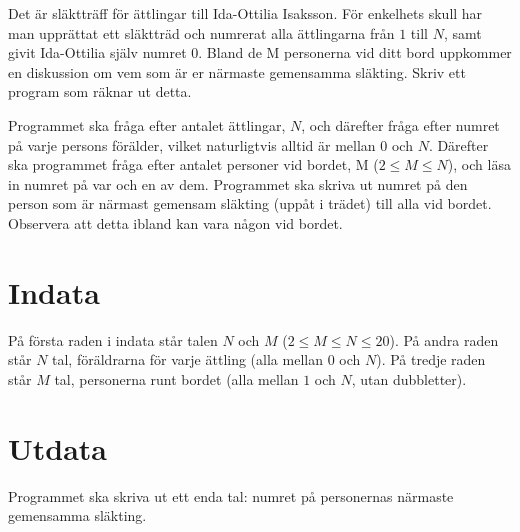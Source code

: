 Det är släktträff för ättlingar till Ida-Ottilia Isaksson.
För enkelhets skull har man upprättat ett släktträd och numrerat alla ättlingarna från $1$ till $N$, samt givit Ida-Ottilia själv numret $0$.
Bland de M personerna vid ditt bord uppkommer en diskussion om vem som är er närmaste gemensamma släkting.
Skriv ett program som räknar ut detta.

Programmet ska fråga efter antalet ättlingar, $N$, och därefter fråga efter numret på varje persons förälder, vilket naturligtvis alltid är mellan $0$ och $N$.
Därefter ska programmet fråga efter antalet personer vid bordet, M ($2 \le M \le N$), och läsa in numret på var och en av dem.
Programmet ska skriva ut numret på den person som är närmast gemensam släkting (uppåt i trädet) till alla vid bordet.
Observera att detta ibland kan vara någon vid bordet.

\section*{Indata}
På första raden i indata står talen $N$ och $M$ ($2 \le M \le N \le 20$).
På andra raden står $N$ tal, föräldrarna för varje ättling (alla mellan $0$ och $N$).
På tredje raden står $M$ tal, personerna runt bordet (alla mellan $1$ och $N$, utan dubbletter).

\section*{Utdata}
Programmet ska skriva ut ett enda tal: numret på personernas närmaste gemensamma släkting.
